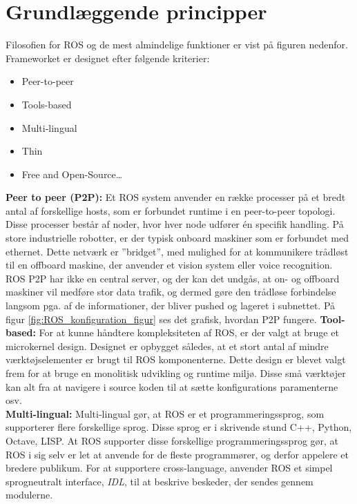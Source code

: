 \section{Grundlæggende principper}
Filosofien for ROS og de mest almindelige funktioner er vist på figuren nedenfor.
Frameworket er designet efter følgende kriterier:
\begin{itemize}  
\item Peer-to-peer
\item Tools-based 
\item Multi-lingual
\item Thin
\item Free and Open-Source\ldots 
\end{itemize}
\textbf{Peer to peer (P2P):}
Et ROS system anvender en række processer på et bredt antal af forskellige hosts, som er forbundet runtime i en peer-to-peer topologi.
Disse processer består af noder, hvor hver node udfører én specifik handling. På store industrielle robotter, er der typisk onboard maskiner som er forbundet med ethernet.
Dette netværk er ''bridget'', med mulighed for at kommunikere trådløst til en offboard maskine, der anvender et vision system eller voice recognition.
ROS P2P har ikke en central server, og der kan det undgås, at on- og offboard maskiner vil medføre stor data trafik, og dermed gøre den trådløse forbindelse langsom pga. af de informationer, der bliver pushed og lageret i subnettet.
På figur \ref{fig:ROS_konfiguration_figur} ses det grafisk, hvordan P2P fungere. 
\textbf{Tool-based:} For at kunne håndtere kompleksiteten af ROS, er der valgt at bruge et microkernel design.
Designet er opbygget således, at et stort antal af mindre værktøjselementer er brugt til ROS komponenterne.
Dette design er blevet valgt frem for at bruge en monolitisk udvikling og runtime miljø.
Disse små værktøjer kan alt fra at navigere i source koden til at sætte konfigurations paramenterne osv.\\
\newline
\textbf{Multi-lingual:} Multi-lingual gør, at ROS er et programmeringssprog, som supporterer flere forskellige sprog.
Disse sprog er i skrivende stund C++, Python, Octave, LISP.
At ROS supporter disse forskellige programmeringssprog gør, at ROS i sig selv er let at anvende for de fleste programmører, og derfor appelere et bredere publikum.
For at supportere cross-language, anvender ROS et simpel sprogneutralt interface, \textit{IDL}, til at beskrive beskeder, der sendes gennem modulerne.
